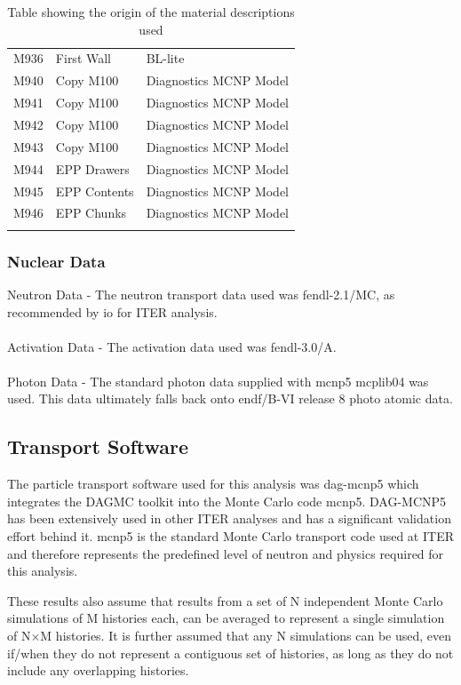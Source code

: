\documentclass[12pt]{article}
\begin{document}
\begin{centering}
\begin{longtable}[ht!]{ p{} | p{} | p{} }
  M936 & First Wall & BL-lite \\
  M940 & Copy M100 & Diagnostics MCNP Model \\
  M941 & Copy M100 & Diagnostics MCNP Model \\
  M942 & Copy M100 & Diagnostics MCNP Model \\
  M943 & Copy M100 & Diagnostics MCNP Model \\
  M944 & EPP Drawers & Diagnostics MCNP Model \\
  M945 & EPP Contents & Diagnostics MCNP Model \\
  M946 & EPP Chunks & Diagnostics MCNP Model \\
 \caption{Table showing the origin of the material descriptions used}
 \label{tab:material_origin}
 \end{longtable}
\end{centering}

\subsubsection*{Nuclear Data}
Neutron Data - The neutron transport data used was \gls{fendl}-2.1/MC, as 
recommended by \gls{io} for ITER analysis. 
\\
\\
Activation Data - The activation data used was \gls{fendl}-3.0/A.
\\
\\
Photon Data - The standard photon data supplied with \gls{mcnp5} mcplib04 was 
used. This data ultimately falls back onto \gls{endf}/B-VI release 8 photo
atomic data.

\subsection{Transport Software}
The particle transport software used for this analysis was \gls{dag}-\gls{mcnp5}
which integrates the DAGMC toolkit into the Monte Carlo code \gls{mcnp5}. 
DAG-MCNP5 has been extensively used in other ITER analyses and has a significant
validation effort behind it. \gls{mcnp5} is the standard Monte Carlo transport code
used at ITER and therefore represents the predefined level of neutron and physics
required for this analysis.

These results also assume that results from a set of N independent Monte Carlo
simulations of M histories each, can be averaged to represent a single
simulation of N$\times$M histories.  It is further assumed that any N
simulations can be used, even if/when they do not represent a contiguous set
of histories, as long as they do not include any overlapping histories.
\end{document}
